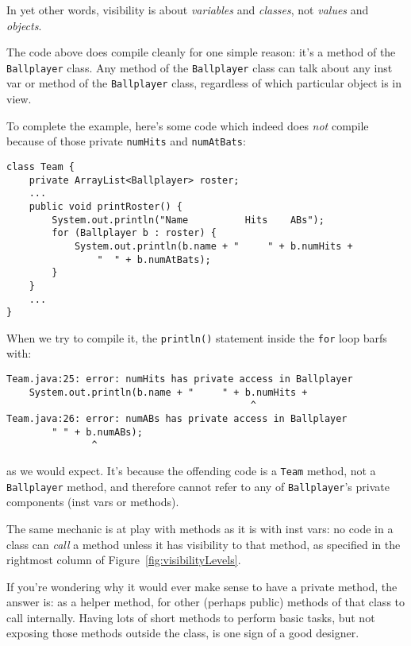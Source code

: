 In yet other words, visibility is about \textit{variables} and
\textit{classes}, not \textit{values} and \textit{objects}.

The code above does compile cleanly for one simple reason: it's a method of the
\texttt{Ballplayer} class. Any method of the \texttt{Ballplayer} class can talk
about any inst var or method of the \texttt{Ballplayer} class, regardless of
which particular object is in view.

To complete the example, here's some code which indeed does \textit{not}
compile because of those private \texttt{numHits} and \texttt{numAtBats}:

\begin{Verbatim}[fontsize=\footnotesize,samepage=true,frame=single]
class Team {
    private ArrayList<Ballplayer> roster;
    ...    
    public void printRoster() {
        System.out.println("Name          Hits    ABs");
        for (Ballplayer b : roster) {
            System.out.println(b.name + "     " + b.numHits +
                "  " + b.numAtBats);
        }
    }
    ...
}
\end{Verbatim}

\begin{samepage}
When we try to compile it, the \texttt{println()} statement inside the
\texttt{for} loop barfs with:
\footnotesize
\begin{verbatim}
Team.java:25: error: numHits has private access in Ballplayer
    System.out.println(b.name + "     " + b.numHits +
                                           ^
Team.java:26: error: numABs has private access in Ballplayer
        " " + b.numABs);
               ^
\end{verbatim}
\normalsize
\vspace{-.2in}
as we would expect. It's because the offending code is a \texttt{Team} method,
not a \texttt{Ballplayer} method, and therefore cannot refer to any of
\texttt{Ballplayer}'s private components (inst vars or methods).
\end{samepage}

The same mechanic is at play with methods as it is with inst vars: no code in
a class can \textit{call} a method unless it has visibility to that method,
as specified in the rightmost column of Figure~\ref{fig:visibilityLevels}.

If you're wondering why it would ever make sense to have a private method, the
answer is: as a helper method, for other (perhaps public) methods of that
class to call internally. Having lots of short methods to perform basic tasks,
but not exposing those methods outside the class, is one sign of a good
designer.

